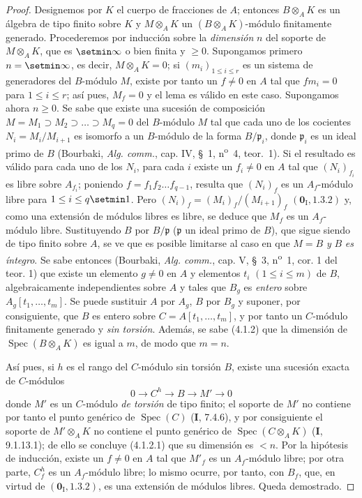 \begin{proof}
Designemos por $K$ el cuerpo de fracciones de $A$; entonces $B\otimes_AK$ es un
álgebra de tipo finito sobre $K$ y $M\otimes_AK$ un $(B\otimes_AK)$-módulo
finitamente generado. Procederemos por inducción
sobre la \emph{dimensión} $n$ del soporte de
$M\otimes_AK$, que es $\setmin\infty$ o bien finita y $\geq0$. Supongamos primero
$n=\setmin\infty$, es decir, $M\otimes_AK=0$; si $(m_i)_{1\leq i\leq r}$ es
un sistema de generadores del $B$-módulo $M$, existe por tanto un $f\ne0$ en
$A$ tal que $fm_i=0$ para $1\leq i\leq r$; así pues, $M_f=0$ y el lema es válido
en este caso. Supongamos ahora $n\geq0$. Se sabe que existe una sucesión de composición
$M=M_1\supset M_2\supset\ldots\supset M_q=0$ del $B$-módulo $M$
tal que cada uno de los cocientes $N_i=M_i/M_{i+1}$ es isomorfo a un
$B$-módulo de la forma $B/\mathfrak p_i$, donde $\mathfrak p_i$ es un ideal
primo de $B$ (Bourbaki, \emph{Alg. comm.}, cap. IV, \S~1, n\textsuperscript{o}~4, teor.~1).
Si el resultado es válido para cada uno de los $N_i$, para cada $i$ existe un
$f_i\ne0$ en $A$ tal que $(N_i)_{f_i}$ es libre sobre $A_{f_i}$; poniendo
$f=f_1f_2\ldots f_{q-1}$, resulta que $(N_i)_f$ es un $A_f$-módulo
libre para $1\leq i\leq q\setmin 1$. Pero $(N_i)_f=(M_i)_f/(M_{i+1})_f$
$(\mathbf{0}_{\mathrm I},1.3.2)$ y, como una extensión de módulos libres es libre,
se deduce que $M_f$ es un $A_f$-módulo libre. Sustituyendo $B$ por
$B/\mathfrak p$ ($\mathfrak p$ un ideal primo de $B$), que sigue siendo de tipo
finito sobre $A$, se ve que es posible limitarse al caso en que $M=B$ \emph{y} $B$ \emph{es íntegro}.
Se sabe entonces (Bourbaki, \emph{Alg. comm.}, cap. V, \S~3, n\textsuperscript{o}~1, cor. 1 del
teor. 1) que existe un elemento $g\ne0$ en $A$ y elementos $t_i$
$(1\leq i\leq m)$ de $B$, algebraicamente independientes sobre $A$ y tales que
$B_g$ es \emph{entero} sobre $A_g[t_1,\ldots,t_m]$. Se puede sustituir $A$ por $A_g$,
$B$ por $B_g$ y suponer, por consiguiente, que $B$ es entero sobre
$C=A[t_1,\ldots,t_m]$, y por tanto un $C$-módulo finitamente generado y \emph{sin torsión}. Además,
se sabe (4.1.2) que la dimensión de $\operatorname{Spec}(B\otimes_AK)$ es
igual a $m$, de modo que $m=n$.

Así pues, si $h$ es el rango del $C$-módulo sin torsión $B$, existe una
sucesión exacta de $C$-módulos
\[
0\longrightarrow C^h\longrightarrow B\longrightarrow M'\longrightarrow0
\]
donde $M'$ es un $C$-módulo \emph{de torsión} de tipo finito; el soporte de $M'$ no
contiene por tanto el punto genérico de $\operatorname{Spec}(C)$ (\textbf I, 7.4.6),
y por consiguiente el soporte de $M'\otimes_AK$ no contiene el punto genérico
de $\operatorname{Spec}(C\otimes_AK)$ (\textbf I, 9.1.13.1); de ello se concluye (4.1.2.1)
que su dimensión es $<n$. Por la hipótesis de inducción, existe un
$f\ne0$ en $A$ tal que $M'_f$ es un $A_f$-módulo libre; por otra parte,
$C_f^h$ es un $A_f$-módulo libre; lo mismo ocurre, por tanto, con $B_f$, que,
en virtud de $(\mathbf{0}_{\mathrm I},1.3.2)$, es una extensión de módulos libres. Queda demostrado.
\end{proof}
